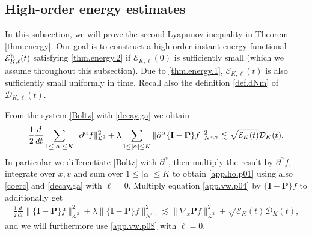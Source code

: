 \documentclass{amsart}
\numberwithin{equation}{section}
\begin{document}
\subsection{High-order energy estimates}

In this subsection, we will prove the second Lyapunov inequality in Theorem \ref{thm.energy}. Our goal is to construct a high-order instant energy functional ${\mathcal{E}}_{{K}, {\ell}}^{\rm h}(t)$ satisfying \eqref{thm.energy.2} if ${\mathcal{E}}_{{K}, {\ell}}(0)$ is sufficiently small (which we assume throughout this subsection). Due to \eqref{thm.energy.1}, ${\mathcal{E}}_{{K}, {\ell}}(t)$ is also sufficiently small uniformly in time. Recall also the definition \eqref{def.dNm} of ${\mathcal{D}}_{{K}, {\ell}}(t)$.  

\medskip

 From the system \eqref{Boltz} with \eqref{decay.ga} we obtain
\begin{equation}\label{app.ho.p01}
{\displaystyle} \frac{1}{2}\frac{d}{dt}\sum_{1\leq |{\alpha}|\leq {K}}\|{\partial}^{\alpha} {f}\|_{{\mathcal{L}}^2}^2+ {\lambda} \sum_{1\leq |{\alpha}|\leq {K}}
\|{\partial}^{\alpha}\{{\mathbf{I}}-{\mathbf{P}}\} {f}\|_{N^{s,\gamma}}^2
\lesssim \sqrt{{\mathcal{E}}_{K}(t)}{\mathcal{D}}_{K}(t).
\end{equation}
In particular we differentiate \eqref{Boltz} with ${\partial}^{\alpha}$, then multiply the result by ${\partial}^{\alpha} {f}$, integrate over 
$x,{v}$ and sum over $1\leq |{\alpha}|\leq {K}$ to obtain \eqref{app.ho.p01} using also \eqref{coerc} and \eqref{decay.ga} 
with ${\ell} =0$.
Multiply equation \eqref{app.vw.p04} by $\{{\mathbf{I}}-{\mathbf{P}}\}{f}$ to additionally get
\begin{multline}\label{app.ho.p02}
     \frac{1}{2}\frac{d}{dt}\|\{{\mathbf{I}}-{\mathbf{P}}\}{f}\|_{{\mathcal{L}}^2}^2+{\lambda} \|\{{\mathbf{I}}-{\mathbf{P}}\}{f}\|_{N^{s,\gamma}}^2
     \lesssim
      \|{\nabla}_x{\mathbf{P}} {f}\|_{{\mathcal{L}}^2}^2
     +
     \sqrt{{\mathcal{E}}_{K}(t)}{\mathcal{D}}_{K}(t),
\end{multline}
and we will furthermore use \eqref{app.vw.p08} with ${\ell} =0$.   
\end{document}
